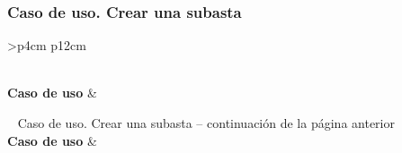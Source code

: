 \subsubsection{Caso de uso. Crear una subasta} \label{sec:cu_crear-subasta}
\begin{longtable}{
    >{}p{4cm}
    p{12cm}
    }
    \caption{Caso de uso. Crear una subasta} \label{table:cu_crear-subasta} \\
    \toprule
    \textbf{Caso de uso} &  \\
    \endfirsthead
    
    {{ \tablename\ \thetable{} Caso de uso. Crear una subasta -- continuación de la página anterior}} \\
    \toprule
    \textbf{Caso de uso} &  \\
    \midrule
    \endhead
    
    \midrule
     \\ 
    \endfoot
    
    \bottomrule
    \endlastfoot
    

\end{longtable}
